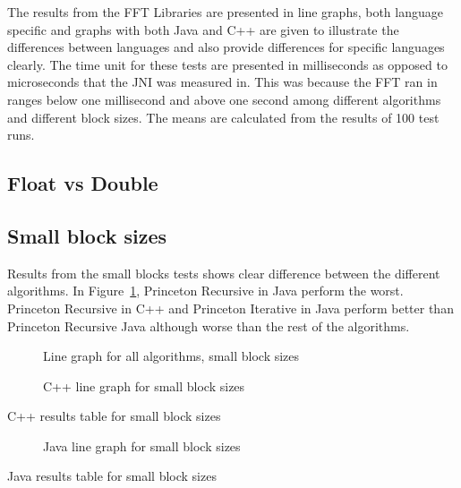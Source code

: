 The results from the FFT Libraries are presented in line graphs, both language specific and graphs with both Java and C++ are given to illustrate the differences between languages and also provide differences for specific languages clearly. The time unit for these tests are presented in milliseconds as opposed to microseconds that the JNI was measured in. This was because the FFT ran in ranges below one millisecond and above one second among different algorithms and different block sizes. The means are calculated from the results of 100 test runs.

\subsection{Float vs Double}

\subsection{Small block sizes}
Results from the small blocks tests shows clear difference between the different algorithms. In Figure~\ref{fig:all:line:small}, Princeton Recursive in Java perform the worst. Princeton Recursive in C++ and Princeton Iterative in Java perform better than Princeton Recursive Java although worse than the rest of the algorithms. %




\begin{figure}
    \centering
    
    \caption{Line graph for all algorithms, small block sizes}
    \label{fig:all:line:small}
\end{figure}

\begin{figure}
    \centering
    
    \caption{C++ line graph for small block sizes}
    \label{fig:cpp:line:small}
\end{figure}
\begin{table}
    \centering
    \caption{C++ results table for small block sizes}
    \label{tab:cpp:small}
    \resizebox{\columnwidth}{!}{
        
    }
\end{table}


\begin{figure}
    \centering
    
    \caption{Java line graph for small block sizes}
    \label{fig:java:line:small}
\end{figure}
\begin{table}
    \centering
    \caption{Java results table for small block sizes}
    \label{tab:java:small}
    \resizebox{\columnwidth}{!}{
        
    }
\end{table}

